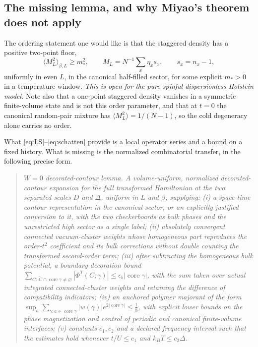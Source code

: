 \documentclass[11pt]{article}
\theoremstyle{definition}
\theoremstyle{remark}
\begin{document}
\subsection{The missing lemma, and why Miyao's theorem does not apply}

The ordering statement one would like is that the staggered density has a
positive two-point floor,
\begin{equation}
\bigl\langle M_{L}^{2}\bigr\rangle_{\beta,L}\ge m_{*}^{2},\qquad
M_{L}=N^{-1}\sum_{x}\eta_{x}s_{x},\qquad s_{x}=n_{x}-1,
\label{eq:ML}
\end{equation}
uniformly in even $L$, in the canonical half-filled sector, for some explicit
$m_{*}>0$ in a temperature window. \emph{This is open for the pure spinful
dispersionless Holstein model.} Note also that a one-point staggered density
vanishes in a symmetric finite-volume state and is not this order parameter, and
that at $t=0$ the canonical random-pair mixture has
$\langle M_{L}^{2}\rangle=1/(N-1)$, so the cold degeneracy alone carries no
order.

What \eqref{eq:LS}--\eqref{eq:schatten} provide is a local operator series and a
bound on a fixed history. What is missing is the normalized combinatorial
transfer, in the following precise form.

\begin{quote}\itshape
$W=0$ decorated-contour lemma. A volume-uniform, normalized decorated-contour
expansion for the full transformed Hamiltonian at the two separated scales $D$ and
$\Delta$, uniform in $L$ and $\beta$, supplying: (i) a space-time contour
representation in the canonical sector, or an explicitly justified conversion to
it, with the two checkerboards as bulk phases and the unrestricted high sector as
a single label; (ii) absolutely convergent connected vacuum-cluster weights whose
homogeneous part reproduces the order-$t^{2}$ coefficient and its bulk corrections
without double counting the transformed second-order term; (iii) after subtracting
the homogeneous bulk potential, a boundary-decoration bound
$\sum_{C:\,\widetilde C\cap\operatorname{core}\gamma\ne\varnothing}
|\Phi^{T}(C;\gamma)|\le\epsilon_{b}|\operatorname{core}\gamma|$, with the sum
taken over actual integrated connected-cluster weights and retaining the
difference of compatibility indicators; (iv) an anchored polymer majorant of the
form $\sup_{a}\sum_{\gamma:a\in\operatorname{core}\gamma}|w(\gamma)|e^{2|\operatorname{core}\gamma|}\le\frac18$,
with explicit lower bounds on the phase magnetization and control of
periodic and canonical finite-volume interfaces; (v) constants $c_{1},c_{2}$ and a
declared frequency interval such that the estimates hold whenever $t/U\le c_{1}$
and $k_{B}T\le c_{2}\Delta$.
\end{quote}
\end{document}
